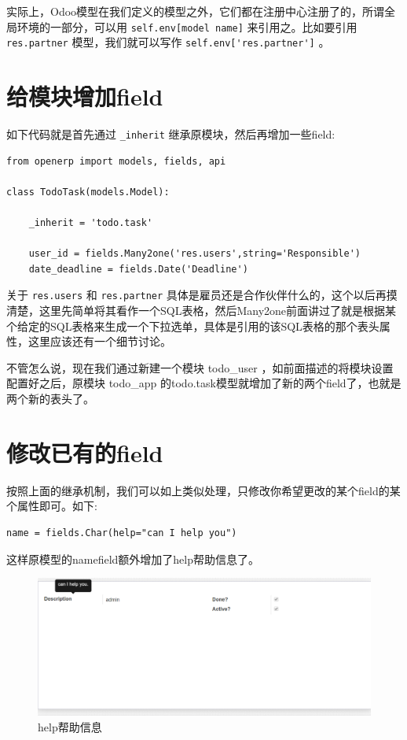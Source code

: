 \documentclass[11pt,a4paper]{sphinxmanual}
\begin{document}
实际上，Odoo模型在我们定义的模型之外，它们都在注册中心注册了的，所谓全局环境的一部分，可以用 \verb~self.env[model name]~ 来引用之。比如要引用 \verb~res.partner~ 模型，我们就可以写作 \verb~self.env['res.partner']~ 。


\section{给模块增加field}
\label{sec-8-1}
如下代码就是首先通过 \verb~_inherit~ 继承原模块，然后再增加一些field:

\begin{verbatim}
from openerp import models, fields, api

class TodoTask(models.Model):

    _inherit = 'todo.task'

    user_id = fields.Many2one('res.users',string='Responsible')
    date_deadline = fields.Date('Deadline')
\end{verbatim}

关于 \verb~res.users~ 和 \verb~res.partner~ 具体是雇员还是合作伙伴什么的，这个以后再摸清楚，这里先简单将其看作一个SQL表格，然后Many2one前面讲过了就是根据某个给定的SQL表格来生成一个下拉选单，具体是引用的该SQL表格的那个表头属性，这里应该还有一个细节讨论。

不管怎么说，现在我们通过新建一个模块 todo\_user ，如前面描述的将模块设置配置好之后，原模块 todo\_app 的todo.task模型就增加了新的两个field了，也就是两个新的表头了。


\section{修改已有的field}
\label{sec-8-2}
按照上面的继承机制，我们可以如上类似处理，只修改你希望更改的某个field的某个属性即可。如下:

\begin{Verbatim}
name = fields.Char(help="can I help you")
\end{Verbatim}

这样原模型的namefield额外增加了help帮助信息了。

\begin{figure}[H]
\centering
\includegraphics[keepaspectratio,max width=0.95\linewidth]{images/help帮助信息.png}
\caption{help帮助信息}
\end{figure}
\end{document}
